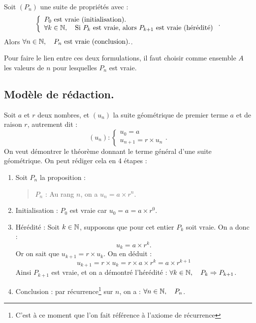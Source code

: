 \documentclass[a4paper,11pt,DIV14,BCOR0mm]{scrartcl}
\begin{document}
\begin{axiome}
	Soit $(P_n)$ une suite de propriétés avec :  
\[
	\left\{\begin{array}{ll}P_0\text{ est vraie (initialisation).}\\\forall k\in\mathbb{N},\quad \text{Si $P_k$ est vraie, alors $P_{k+1}$ est vraie (hérédité)}\end{array}\right..
\]
Alors $\forall n\in\mathbb{N},\quad P_n \text{ est vraie (conclusion).}$.
\end{axiome}
Pour faire le lien entre ces deux formulations, il faut choisir comme ensemble $A$ les valeurs de $n$ pour lesquelles $P_n$
est vraie.
\subsection{Modèle de rédaction.}
\begin{exemple}
Soit $a$ et $r$ deux nombres, et $(u_n)$ la suite géométrique de premier terme $a$ et de raison $r$, autrement dit :
\[
	(u_n):\left\{\begin{array}{ll}
	      	u_0=a\\
          u_{n+1}=r\times u_n
	      \end{array}\right..
\]
On veut démontrer le théorème donnant le terme général d'une suite géométrique. 
On peut rédiger cela en 4 étapes :
\begin{enumerate}
\item Soit $P_n$ la proposition :
\begin{quote}
	$P_n$ : \og Au rang $n$, on a $u_n=a\times r^n$\fg.
\end{quote}
	\item Initialisation : $P_0$ est vraie car $u_0=a=a\times r^0$.
  \item Hérédité : Soit $k\in\mathbb{N}$, supposons que pour cet entier $P_k$ soit vraie. On a donc :
\[
	u_k=a\times r^k.
\]
Or on sait que $u_{k+1}=r\times u_k$. On en déduit :
\[
	u_{k+1}=r\times u_k=r\times a\times r^k=a\times r^{k+1}
\]
Ainsi $P_{k+1}$ est vraie, et on a démontré l'hérédité : $\forall k\in\mathbb{N},\quad P_k\Rightarrow P_{k+1}$.
  \item Conclusion : par récurrence\footnote{C'est à ce moment que l'on fait référence à l'axiome de récurrence} sur $n$,
on a : $\forall n\in\mathbb{N},\quad P_n$.
\end{enumerate}

\end{exemple}
\end{document}
